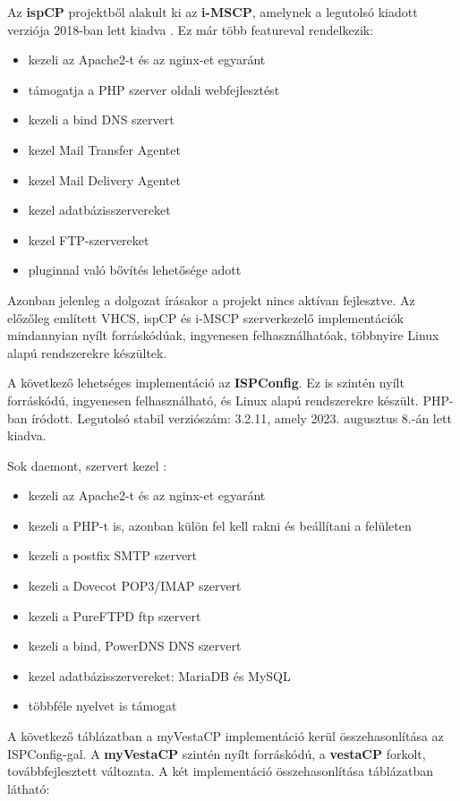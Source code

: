Az \textbf{ispCP} projektből alakult ki az \textbf{i-MSCP}, amelynek a legutolsó kiadott verziója 2018-ban lett kiadva \cite{imscp}. Ez már több featureval rendelkezik:
\begin{itemize}
	\item kezeli az Apache2-t és az nginx-et egyaránt
	\item támogatja a PHP szerver oldali webfejlesztést
	\item kezeli a bind DNS szervert
	\item kezel Mail Transfer Agentet
	\item kezel Mail Delivery Agentet
	\item kezel adatbázisszervereket
	\item kezel FTP-szervereket
	\item pluginnal való bővítés lehetősége adott
\end{itemize}
Azonban jelenleg a dolgozat írásakor a projekt nincs aktívan fejlesztve. Az előzőleg említett VHCS, ispCP és i-MSCP szerverkezelő implementációk mindannyian nyílt forráskódúak, ingyenesen felhasználhatóak, többnyire Linux alapú rendszerekre készültek.

A következő lehetséges implementáció az \textbf{ISPConfig}. Ez is szintén nyílt forráskódú, ingyenesen felhasználható, és Linux alapú rendszerekre készült. PHP-ban íródott. Legutolsó stabil verziószám: 3.2.11, amely 2023. augusztus 8.-án lett kiadva. \cite{ispconfig}

Sok daemont, szervert kezel \cite{ispconfig2}:
\begin{itemize}
	\item kezeli az Apache2-t és az nginx-et egyaránt
	\item kezeli a PHP-t is, azonban külön fel kell rakni és beállítani a felületen
	\item kezeli a postfix SMTP szervert
	\item kezeli a Dovecot POP3/IMAP szervert
	\item kezeli a PureFTPD ftp szervert
	\item kezeli a bind, PowerDNS DNS szervert
	\item kezel adatbázisszervereket: MariaDB és MySQL
	\item többféle nyelvet is támogat
\end{itemize}

A következő táblázatban a myVestaCP implementáció kerül összehasonlítása az ISPConfig-gal.
A \textbf{myVestaCP} szintén nyílt forráskódú, a \textbf{vestaCP} forkolt, továbbfejlesztett változata. A két implementáció összehasonlítása  táblázatban látható:

